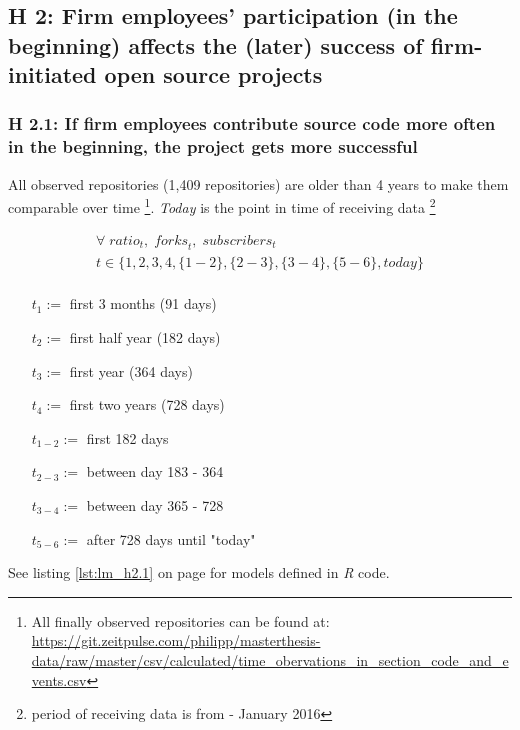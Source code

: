 \clearpage
\subsection{H 2: Firm employees' participation (in the beginning) affects the (later) success of firm-initiated open source projects}
\label{sec:h2_analysis}
\subsubsection{H 2.1: If firm employees contribute source code more often in the beginning, the project gets more successful}

All observed repositories (1,409 repositories) are older than 4 years to make them comparable over time \footnote{All finally observed repositories can be found at: \url{https://git.zeitpulse.com/philipp/masterthesis-data/raw/master/csv/calculated/time_obervations_in_section_code_and_events.csv}}. \textit{Today} is the point in time of receiving data \footnote{period of receiving data is from  -  January 2016}

\begin{align}
	\forall \; \mathit{ratio}_t, \; \mathit{forks}_t, \; \mathit{subscribers}_t \\
	t \in \{ 1, 2, 3, 4, \{ 1 - 2 \}, \{ 2 - 3 \}, \{ 3 - 4 \}, \{ 5 - 6 \}, \textit{today} \} \\
\end{align}

\begin{itemize}
	\item [$t_1 := $] first 3 months (91 days)
	\item [$t_2 := $] first half year (182 days)
	\item [$t_3 := $] first year (364 days)
	\item [$t_4 := $] first two years (728 days)
	\item [$t_{1-2} := $] first 182 days
	\item [$t_{2-3} := $] between day 183 - 364
	\item [$t_{3-4} := $] between day 365 - 728
	\item [$t_{5-6} := $] after 728 days until "today"
\end{itemize}

See listing \ref{lst:lm_h2.1} on page \pageref{lst:lm_h2.1} for models defined in \textit{R} code.


